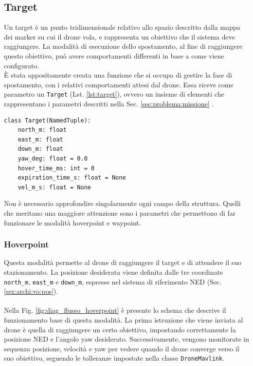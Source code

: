 \subsection{Target}
\label{sec:archi:target}
Un target è un punto tridimensionale relativo allo spazio descritto dalla mappa dei marker su cui il drone vola, e rappresenta un obiettivo che il sistema deve raggiungere. La modalità di esecuzione dello spostamento, al fine di raggiungere questo obiettivo, può avere comportamenti differenti in base a come viene configurato. \\
È stata appositamente creata una funzione che si occupa di gestire la fase di spostamento, con i relativi comportamenti attesi dal drone. Essa riceve come parametro un \texttt{Target} (Lst. \ref{lst:target}), ovvero un insieme di elementi che rappresentano i parametri descritti nella Sec. \ref{sec:problema:missione} .
\begin{lstlisting}[style=pythonstyle, caption={Lista degli elementi che un Target ha}, label={lst:target}]
class Target(NamedTuple):
	north_m: float
	east_m: float
	down_m: float
	yaw_deg: float = 0.0
	hover_time_ms: int = 0
	expiration_time_s: float = None
	vel_m_s: float = None
\end{lstlisting}
Non è necessario approfondire singolarmente ogni campo della struttura. Quelli che meritano una maggiore attenzione sono i parametri che permettono di far funzionare le modalità hoverpoint e waypoint.
\subsubsection{Hoverpoint}
Questa modalità permette al drone di raggiungere il target e di attendere il suo stazionamento. La posizione desiderata viene definita dalle tre coordinate \texttt{north\_m}, \texttt{east\_m} e \texttt{down\_m}, espresse nel sistema di riferimento NED (Sec. \ref{sez:archi:vo:pos}).\\ \\
Nella Fig. \ref{fig:diag_flusso_hoverpoint} è presente lo schema che descrive il funzionamento base di questa modalità. La prima istruzione che viene inviata al drone è quella di raggiungere un certo obiettivo, impostando correttamente la posizione NED e l'angolo yaw desiderato. Successivamente, vengono monitorate in sequenza posizione, velocità e yaw per vedere quando il drone converge verso il suo obiettivo, seguendo le tolleranze impostate nella classe \texttt{DroneMavlink}.

